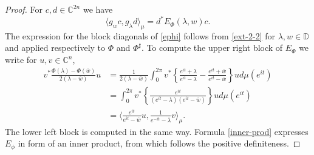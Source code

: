 \documentclass[12pt]{amsart}
\theoremstyle{definition}
\theoremstyle{remark}
\numberwithin{equation}{section}
\begin{document}
\begin{proof}
For $c,d\in\mathbb C^{2n}$ we have
\begin{equation}
  \label{inner-prod}
  \langle g_wc,g_{\lambda}d\rangle_\mu=d^*E_\Phi({\lambda},w)c.
\end{equation}
The expression for the block diagonals of \eqref{ephi} follows from \eqref{ext-2-2} for $\lambda,w\in\mathbb D$ and  applied respectively to $\Phi$ and $\Phi^\sharp$. To compute
the upper right block of $E_\Phi$ we write for $u,v\in\mathbb C^n$,
  \[
    \begin{split}
      v^*\frac{\Phi(\lambda)-\Phi(\overline{w})}{2(\lambda-\overline{w})}u&=
                        \frac{1}{2(\lambda-\overline{w})}\int_0^{2\pi}v^*\left\{\frac{e^{it}+\lambda}{e^{it}-\lambda}-\frac{e^{it}+\overline{w}}{e^{it}-\overline{w}}\right\}
                                                                    u d\mu(e^{it})\\
                                                                   &=\int_0^{2\pi}v^*\left\{\frac{e^{it}}{(e^{it}-\lambda)(e^{it}-\overline{w})}\right\}ud\mu(e^{it})\\
      &=\langle \frac{e^{it}}{e^{it}-\overline{w}}u,\frac{1}{e^{-it}-\overline{\lambda}}v\rangle_\mu.
    \end{split}
  \]
  The lower left block is computed in the same way.
Formula \eqref{inner-prod} expresses $E_\phi$ in form of an inner product, from which follows the positive definiteness.
  \end{proof}
\end{document}
